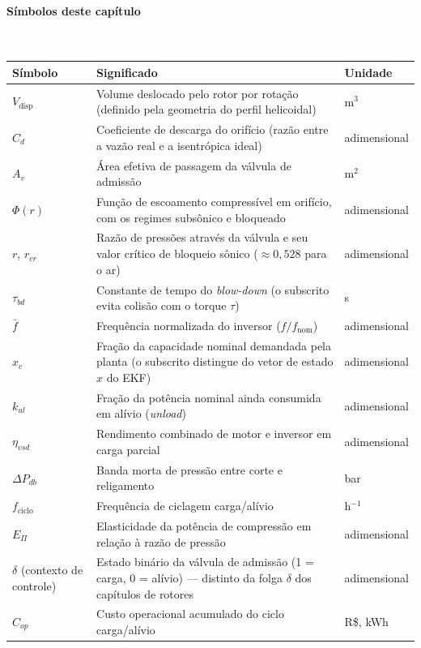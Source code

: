 \documentclass[12pt,a4paper]{article}
\numberwithin{equation}{section}
\numberwithin{table}{section}
\numberwithin{figure}{section}
\begin{document}
{%
\paragraph{Símbolos deste capítulo}\mbox{}\\[-0.5em]
{\small
\begin{longtable}{>{\raggedright\arraybackslash}p{2.6cm} >{\raggedright\arraybackslash}p{9.2cm} >{\raggedright\arraybackslash}p{2.6cm}}
	\toprule
	\textbf{Símbolo} & \textbf{Significado} & \textbf{Unidade} \\ \midrule
	\endhead
	$V_{\text{disp}}$ & Volume deslocado pelo rotor por rotação (definido pela geometria do perfil helicoidal) & m$^3$ \\
	$C_d$ & Coeficiente de descarga do orifício (razão entre a vazão real e a isentrópica ideal) & adimensional \\
	$A_v$ & Área efetiva de passagem da válvula de admissão & m$^2$ \\
	$\Phi(r)$ & Função de escoamento compressível em orifício, com os regimes subsônico e bloqueado & adimensional \\
	$r$, $r_{cr}$ & Razão de pressões através da válvula e seu valor crítico de bloqueio sônico ($\approx 0{,}528$ para o ar) & adimensional \\
	$\tau_{bd}$\dag & Constante de tempo do \textit{blow-down} (o subscrito evita colisão com o torque $\tau$) & s \\
	$\bar{f}$ & Frequência normalizada do inversor ($f/f_{\text{nom}}$) & adimensional \\
	$x_c$\dag & Fração da capacidade nominal demandada pela planta (o subscrito distingue do vetor de estado $x$ do EKF) & adimensional \\
	$k_{ul}$ & Fração da potência nominal ainda consumida em alívio (\textit{unload}) & adimensional \\
	$\eta_{vsd}$ & Rendimento combinado de motor e inversor em carga parcial & adimensional \\
	$\Delta P_{db}$ & Banda morta de pressão entre corte e religamento & bar \\
	$f_{\text{ciclo}}$ & Frequência de ciclagem carga/alívio & h$^{-1}$ \\
	$E_{\Pi}$ & Elasticidade da potência de compressão em relação à razão de pressão & adimensional \\
	$\delta$ (contexto de controle)\dag & Estado binário da válvula de admissão (1 = carga, 0 = alívio) — distinto da folga $\delta$ dos capítulos de rotores & adimensional \\
	$C_{op}$ & Custo operacional acumulado do ciclo carga/alívio & R\$, kWh \\
	\bottomrule
\end{longtable}
}




}
\end{document}
